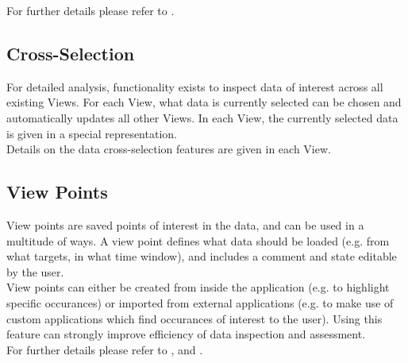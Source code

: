 For further details please refer to .

\subsection{Cross-Selection}

For detailed analysis, functionality exists to inspect data of interest across all existing Views. For each View, what data is currently selected can be chosen and automatically updates all other Views. In each View, the currently selected data is given in a special representation. \\

Details on the data cross-selection features are given in each View.

\subsection{View Points}

View points are saved points of interest in the data, and can be used in a multitude of ways. A view point defines what data should be loaded (e.g. from what targets, in what time window), and includes a comment and state editable by the user.  \\
View points can either be created from inside the application (e.g. to highlight specific occurances) or imported from external applications (e.g. to make use of custom applications which find occurances of interest to the user). Using this feature can strongly improve efficiency of data inspection and assessment. \\

For further details please refer to ,  and .
